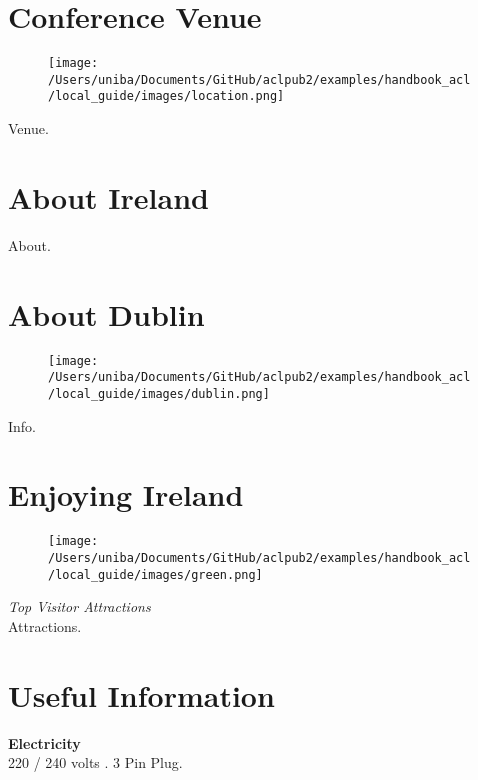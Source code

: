 \section{Conference Venue}

 \begin{figure}[h!]
  \centering
      \texttt{[image: /Users/uniba/Documents/GitHub/aclpub2/examples/handbook\_acl/local\_guide/images/location.png]}
 \end{figure}

Venue.
\section{About Ireland}

About.
\section{About Dublin}

 \begin{figure}[h!]
  \centering
      \texttt{[image: /Users/uniba/Documents/GitHub/aclpub2/examples/handbook\_acl/local\_guide/images/dublin.png]}
 \end{figure}
 \leavevmode\newline

Info. \\

\section{Enjoying Ireland}

 \begin{figure}[h!]
  \centering
      \texttt{[image: /Users/uniba/Documents/GitHub/aclpub2/examples/handbook\_acl/local\_guide/images/green.png]}
 \end{figure}
 \leavevmode\newline

{\Large \textit{Top Visitor Attractions}}\\
Attractions. \\


 \leavevmode\newline
\section{Useful Information}

{\large \textbf{Electricity}}\\
220 / 240 volts . 3 Pin Plug.\\

